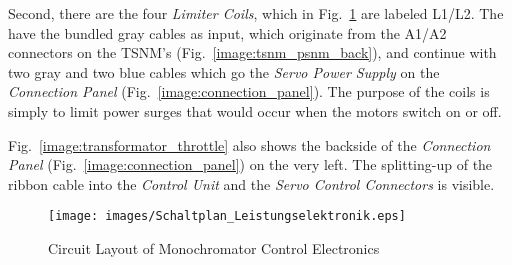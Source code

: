 Second, there are the four \emph{Limiter Coils}, which in
Fig.~\ref{image:Schaltplan_Leistungselektronik} are labeled L1/L2. The have the
bundled gray cables as input, which originate from the A1/A2 connectors on the
TSNM's (Fig.~\ref{image:tsnm_psnm_back}), and continue with two gray and two
blue cables which go the \emph{Servo Power Supply} on the \emph{Connection
Panel} (Fig.~\ref{image:connection_panel}). The purpose of the coils is simply
to limit power surges that would occur when the motors switch on or off.

Fig.~\ref{image:transformator_throttle} also shows the backside of the
\emph{Connection Panel} (Fig.~\ref{image:connection_panel}) on the very left.
The splitting-up of the ribbon cable into the \emph{Control Unit} and the
\emph{Servo Control Connectors} is visible.

\begin{figure}[htbp]
    \centering
\texttt{[image: images/Schaltplan\_Leistungselektronik.eps]}
    \caption{Circuit Layout of Monochromator Control Electronics}
  \label{image:Schaltplan_Leistungselektronik}
\end{figure}

